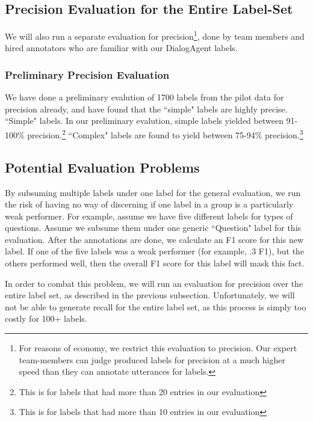 \subsection{Precision Evaluation for the Entire Label-Set}

We will also run a separate evaluation for precision\footnote{For reasons of
economy, we restrict this evaluation to precision. Our expert team-members can
judge produced labels for precision at a much higher speed than they can
annotate utterances for labels.}, done by team members and hired annotators who
are familiar with our DialogAgent labels.


\subsubsection{Preliminary Precision Evaluation} 
\label{subsec:rule_evaluation}

We have done a preliminary evalution of 1700 labels from the pilot data for
precision already, and have found that the ``simple" labels are highly precise.
``Simple" labels. In our preliminary evalution, simple labels yielded between
91-100\% precision.\footnote{This is for labels that had more than 20 entries
in our evaluation} ``Complex" labels are found to yield between 75-94\%
precision.\footnote{This is for labels that had more than 10 entries in our
evaluation}

\subsection{Potential Evaluation Problems}

By subsuming multiple labels under one label for the general evaluation, we run
the risk of having no way of discerning if one label in a group is a
particularly weak performer. For example, assume we have five different labels
for types of questions. Assume we subsume them under one generic ``Question"
label for this evaluation. After the annotations are done, we calculate an F1
score for this new label. If one of the five labels was a weak performer (for
example, .3 F1), but the others performed well, then the overall F1 score for
this label will mask this fact. 

In order to combat this problem, we will run an evaluation for precision over
the entire label set, as described in the previous subsection. Unfortunately,
we will not be able to generate recall for the entire label set, as this
process is simply too costly for 100+ labels.
